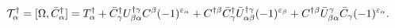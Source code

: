 \begin{equation}\label{5.13}
{\cal T}^\dagger_\alpha=[\Omega,\bar{C}^\dagger_\alpha]=T^\dagger_\alpha+
\bar{C}^\dagger_\gamma U^{\dagger\gamma}_{\beta\alpha}C^\beta
(-1)^{\varepsilon_\alpha}
+C^{\dagger\beta}\bar{C}^\dagger_\gamma\bar{U}^{\dagger\gamma}_{\alpha\beta}
(-1)^{\varepsilon_\beta}+
C^{\dagger\beta}\bar{U}^\gamma_{\beta\alpha}\bar{C}_\gamma
(-1)^{\varepsilon_\alpha}.
\end{equation}

